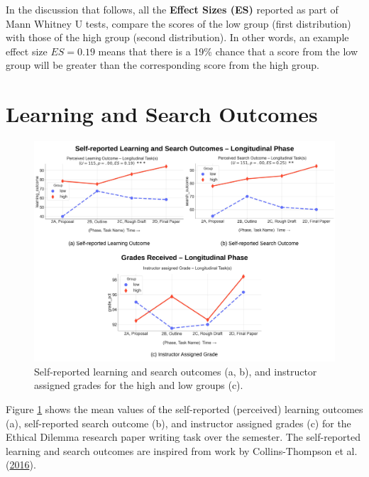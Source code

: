 \documentclass[letterpaper, nobind]{templates/ociamthesis}
\begin{document}
In the discussion that follows, all the \textbf{Effect Sizes (ES)} reported as part of Mann Whitney U tests, compare the scores of the low group (first distribution) with those of the high group (second distribution).
In other words, an example effect size \(ES=0.19\) means that there is a 19\% chance that a score from the low group will be greater than the corresponding score from the high group.

\hypertarget{learning-and-search-outcomes}{%
\section{Learning and Search Outcomes}\label{learning-and-search-outcomes}}

\begin{figure}

{\centering \includegraphics[width=1\linewidth]{figs/rp2-learning-search-outcomes} 

}

\caption[Self-reported learning and search outcomes, and grades received in the longitudinal phase.]{Self-reported learning and search outcomes (a, b), and instructor assigned grades for the high and low groups (c).}\label{fig:rp2-learning-search-outcomes}
\end{figure}





Figure \ref{fig:rp2-learning-search-outcomes} shows the mean values of the self-reported (perceived) learning outcomes (a), self-reported search outcome (b), and instructor assigned grades (c) for the Ethical Dilemma research paper writing task over the semester.
The self-reported learning and search outcomes are inspired from work by Collins-Thompson et al. (\protect\hyperlink{ref-collins2016assessing}{2016}).
\end{document}

